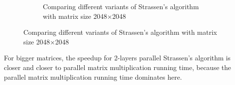 \documentclass{article}
\begin{document}
\begin{figure}[h!]
\begin{subfigure}{.49\textwidth}
\caption{Comparing different variants of Strassen's algorithm with matrix size 2048$\times$2048}
\label{fig:strassen_cmp_2048}
\end{subfigure}
\end{figure}

For bigger matrices, the speedup for 2-layers parallel Strassen's algorithm is closer and closer
to parallel matrix multiplication running time, because the parallel matrix multiplication running time
dominates here.
\end{document}
